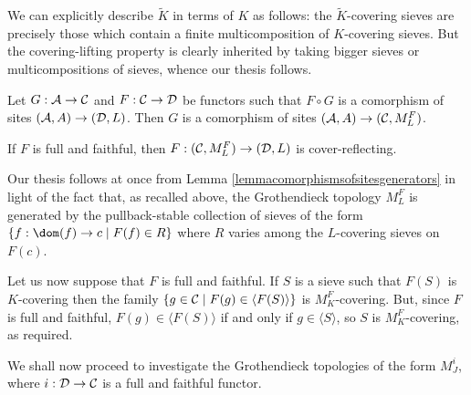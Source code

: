 \documentclass[a4paper,12pt]{article}
\begin{document}
\begin{proofs}
	We can explicitly describe $\tilde{K}$ in terms of $K$ as follows: the $\tilde{K}$-covering sieves are precisely those which contain a finite multicomposition of $K$-covering sieves. But the covering-lifting property is clearly inherited by taking bigger sieves or multicompositions of sieves, whence our thesis follows.
\end{proofs}

\begin{corollary}\label{corliftcomorphismsofsites}
	Let $G:{\cal A}\to {\cal C}$ and $F:{\cal C}\to {\cal D}$ be functors such that $F\circ G$ is a comorphism of sites $({\cal A}, A)\to ({\cal D}, L)$. Then $G$ is a comorphism of sites $({\cal A}, A)\to ({\cal C}, M^{F}_{L})$.
	
	If $F$ is full and faithful, then $F:({\cal C}, M^{F}_{L})\to ({\cal D}, L)$ is cover-reflecting.
\end{corollary}

\begin{proofs}
Our thesis follows at once from Lemma \ref{lemmacomorphismsofsitesgenerators} in light of the fact that, as recalled above, the Grothendieck topology $M^{F}_{L}$ is generated by the pullback-stable collection of sieves of the form $\{f:\dom(f)\to c \mid F(f)\in R\}$ where $R$ varies among the $L$-covering sieves on $F(c)$.
	
Let us now suppose that $F$ is full and faithful. If $S$ is a sieve such that $F(S)$ is $K$-covering then the family $\{g\in {\cal C} \mid F(g)\in \langle F(S)\rangle \}$ is $M^{F}_{K}$-covering. But, since $F$ is full and faithful, $F(g)\in \langle F(S)\rangle $ if and only if $g\in \langle S\rangle $, so $S$ is $M^{F}_{K}$-covering, as required. 	
\end{proofs}

We shall now proceed to investigate the Grothendieck topologies of the form $M^{i}_{J}$, where $i:{\cal D}\to {\cal C}$ is a full and faithful functor. 
\end{document}
